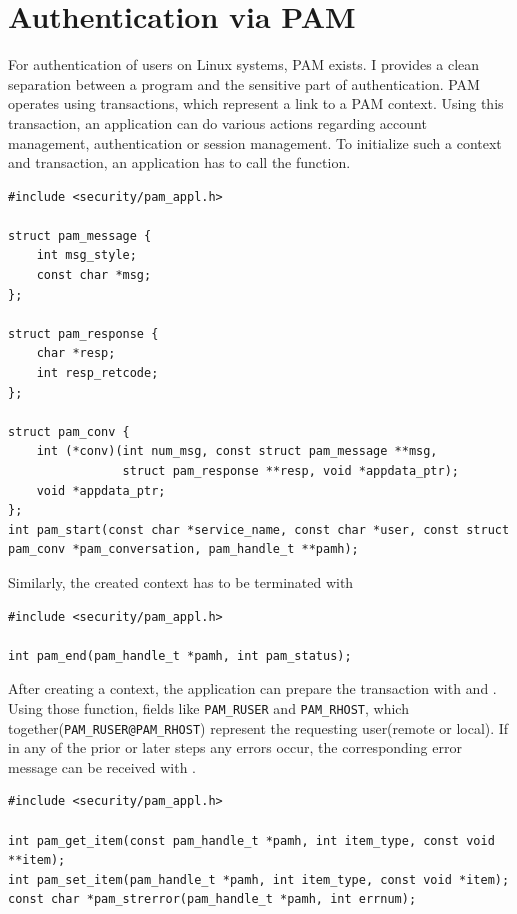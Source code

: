 \documentclass[10pt,a4paper,titlepage,twoside,english,final]{zhawreprt}
\begin{document}
\section{Authentication via PAM}\label{sec:DesignAuthViaPAM}
For authentication of users on Linux systems, \gls{PAM} exists. I provides a clean separation between a program and the sensitive part of authentication. \gls{PAM} operates using transactions, which represent a link to a \gls{PAM} context. Using this transaction, an application can do various actions regarding account management, authentication or session management. To initialize such a context and transaction, an application has to call the \cite{pam_start} function.
\setlistingC
\begin{lstlisting}[caption={Initializing a \gls{PAM} context},label=lst:InitPAMContext]
#include <security/pam_appl.h>

struct pam_message {
    int msg_style;
    const char *msg;
};

struct pam_response {
    char *resp;
    int resp_retcode;
};

struct pam_conv {
    int (*conv)(int num_msg, const struct pam_message **msg,
                struct pam_response **resp, void *appdata_ptr);
    void *appdata_ptr;
};
int pam_start(const char *service_name, const char *user, const struct pam_conv *pam_conversation, pam_handle_t **pamh);
\end{lstlisting}

Similarly, the created context has to be terminated with \cite{pam_end}
\setlistingC
\begin{lstlisting}[caption={Terminating a \gls{PAM} context},label=lst:TermPAMContext]
#include <security/pam_appl.h>

int pam_end(pam_handle_t *pamh, int pam_status);
\end{lstlisting}

After creating a context, the application can prepare the transaction with \cite{pam_set_item} and \cite{pam_get_item}. Using those function, fields like \texttt{PAM\_RUSER} and \texttt{PAM\_RHOST}, which together(\texttt{PAM\_RUSER@PAM\_RHOST}) represent the requesting user(remote or local). If in any of the prior or later steps any errors occur, the corresponding error message can be received with \cite{pam_strerror}.
\setlistingC
\begin{lstlisting}[caption={\gls{PAM} functions},label=lst:PAMFunctions]
#include <security/pam_appl.h>

int pam_get_item(const pam_handle_t *pamh, int item_type, const void **item);
int pam_set_item(pam_handle_t *pamh, int item_type, const void *item);
const char *pam_strerror(pam_handle_t *pamh, int errnum);
\end{lstlisting}
\end{document}
